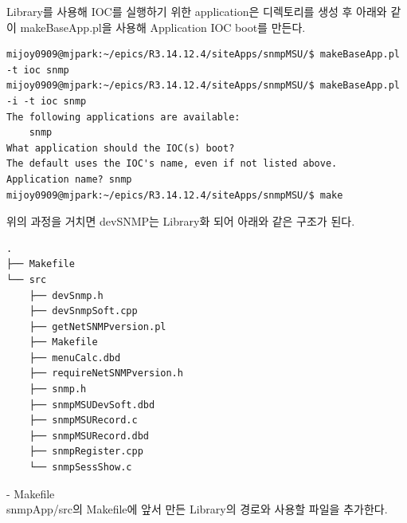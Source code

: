 \documentclass[11pt
  , a4paper
  , article
  , oneside
]{memoir}
\begin{document}
Library를 사용해 IOC를 실행하기 위한 application은 디렉토리를 생성 후 아래와 같이 makeBaseApp.pl을 사용해 Application IOC boot를 만든다.

{\scriptsize
\begin{lstlisting}[style=termstyle]
mijoy0909@mjpark:~/epics/R3.14.12.4/siteApps/snmpMSU/$ makeBaseApp.pl -t ioc snmp 
mijoy0909@mjpark:~/epics/R3.14.12.4/siteApps/snmpMSU/$ makeBaseApp.pl -i -t ioc snmp
The following applications are available:
    snmp
What application should the IOC(s) boot?
The default uses the IOC's name, even if not listed above.
Application name? snmp
mijoy0909@mjpark:~/epics/R3.14.12.4/siteApps/snmpMSU/$ make
\end{lstlisting}
}

\hfill

위의 과정을 거치면 devSNMP는 Library화 되어 아래와 같은 구조가 된다. 
{\scriptsize
\begin{verbatim}
.
├── Makefile
└── src
    ├── devSnmp.h
    ├── devSnmpSoft.cpp
    ├── getNetSNMPversion.pl
    ├── Makefile
    ├── menuCalc.dbd
    ├── requireNetSNMPversion.h
    ├── snmp.h
    ├── snmpMSUDevSoft.dbd
    ├── snmpMSURecord.c
    ├── snmpMSURecord.dbd
    ├── snmpRegister.cpp
    └── snmpSessShow.c
\end{verbatim}
}

\hfill

-­ Makefile\\
snmpApp/src의 Makefile에 앞서 만든 Library의 경로와 사용할 파일을 추가한다. 
\end{document}
